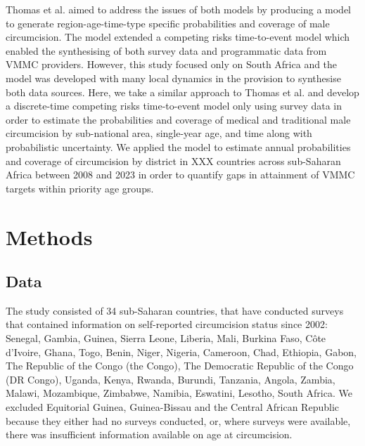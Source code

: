 \documentclass{article}
\begin{document}
Thomas et al. \cite{thomas2024substantial} aimed to address the issues of both models by producing a model to generate region-age-time-type specific probabilities and coverage of male circumcision. The model extended a competing risks time-to-event model which enabled the synthesising of both survey data and programmatic data from VMMC providers. However, this study focused only on South Africa and the model was developed with many local dynamics in the provision to synthesise both data sources. Here, we take a similar approach to Thomas et al. and develop a discrete-time competing risks time-to-event model only using survey data in order to estimate the probabilities and coverage of medical and traditional male circumcision by sub-national area, single-year age, and time along with probabilistic uncertainty. We applied the model to estimate annual probabilities and coverage of circumcision by district in XXX countries across sub-Saharan Africa between 2008 and 2023 in order to quantify gaps in attainment of VMMC targets within priority age groups. 

\newpage
\section{Methods}
\label{sec:orga131cc6}


\subsection{Data}
\label{sec:org020fc8c}


The study consisted of 34 sub-Saharan countries, that have conducted surveys that contained information on self-reported circumcision status since 2002: Senegal, Gambia, Guinea, Sierra Leone, Liberia, Mali, Burkina Faso, Côte d’Ivoire, Ghana, Togo, Benin, Niger, Nigeria, Cameroon, Chad, Ethiopia, Gabon, The Republic of the Congo (the Congo), The Democratic Republic of the Congo (DR Congo), Uganda, Kenya, Rwanda, Burundi, Tanzania, Angola, Zambia, Malawi, Mozambique, Zimbabwe, Namibia, Eswatini, Lesotho, South Africa. 
We excluded Equitorial Guinea, Guinea-Bissau and the Central African Republic because they either had no surveys conducted, or, where surveys were available, there was insufficient information available on age at circumcision.
\end{document}

